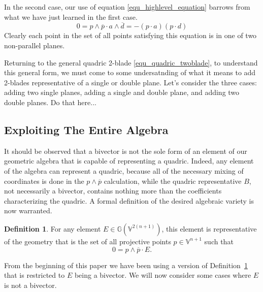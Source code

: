 \documentclass{ecgd-l}
\theoremstyle{definition}
\newtheorem{definition}[theorem]{Definition}
\theoremstyle{remark}
\numberwithin{equation}{section}
\newcommand{\G}{\mathbb{G}}
\newcommand{\V}{\mathbb{V}}
\begin{document}
In the second case, our use of equation \eqref{equ_highlevel_equation} barrows
from what we have just learned in the first case.
\begin{equation}
0 = p\wedge\overline{p}\cdot a\wedge\overline{d} = -(p\cdot a)(p\cdot d)
\end{equation}
Clearly each point in the set of all points satisfying this equation is in
one of two non-parallel planes.

Returning to the general quadric 2-blade \eqref{equ_quadric_twoblade}, to understand
this general form, we must come to some undersatnding of what it means to add 2-blades
representative of a single or double plane.  Let's consider the three cases: adding two single
planes, adding a single and double plane, and adding two double planes.
Do that here...





\subsection{Exploiting The Entire Algebra}

It should be observed that a bivector is not the sole form of an
element of our geometric algebra that is capable of representing
a quadric.  Indeed, any element of the algebra can represent a quadric,
because all of the necessary mixing of coordinates is done in the
$p\wedge\overline{p}$ calculation, while the quadric representative
$B$, not necessarily a bivector, contains nothing more than the coefficients characterizing the quadric.
A formal definition of the desired algebraic variety is now warranted.
\begin{definition}\label{def_quadric_variety}
For any element $E\in\G(\V^{2(n+1)})$, this element is representative of the
geometry that is the set of all projective points $p\in\V^{n+1}$ such that
\begin{equation}
0=p\wedge\overline{p}\cdot E.
\end{equation}
\end{definition}
From the beginning of this paper we have been using a version of
Definition~\ref{def_quadric_variety} that is restricted to $E$ being a bivector.  We will now consider
some cases where $E$ is not a bivector.
\end{document}
